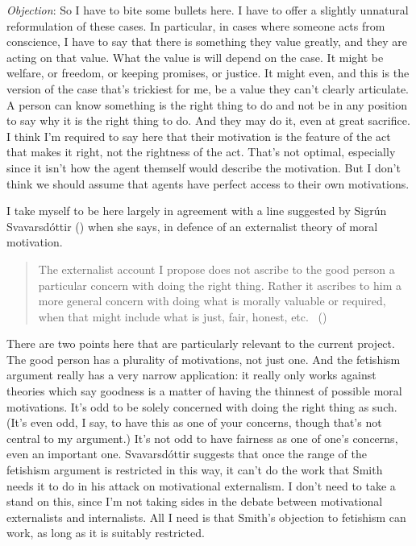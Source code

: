 \documentclass[
  11pt,
  letterpaper,
  DIV=11,
  numbers=noendperiod,
  twoside]{scrartcl}
\begin{document}
\emph{Objection}: So I have to bite some bullets here. I have to offer a
slightly unnatural reformulation of these cases. In particular, in cases
where someone acts from conscience, I have to say that there is
something they value greatly, and they are acting on that value. What
the value is will depend on the case. It might be welfare, or freedom,
or keeping promises, or justice. It might even, and this is the version
of the case that's trickiest for me, be a value they can't clearly
articulate. A person can know something is the right thing to do and not
be in any position to say why it is the right thing to do. And they may
do it, even at great sacrifice. I think I'm required to say here that
their motivation is the feature of the act that makes it right, not the
rightness of the act. That's not optimal, especially since it isn't how
the agent themself would describe the motivation. But I don't think we
should assume that agents have perfect access to their own motivations.

I take myself to be here largely in agreement with a line suggested by
Sigrún Svavarsdóttir () when she
says, in defence of an externalist theory of moral motivation.

\begin{quote}
The externalist account I propose does not ascribe to the good person a
particular concern with doing the right thing. Rather it ascribes to him
a more general concern with doing what is morally valuable or required,
when that might include what is just, fair, honest, etc.
~()
\end{quote}

There are two points here that are particularly relevant to the current
project. The good person has a plurality of motivations, not just one.
And the fetishism argument really has a very narrow application: it
really only works against theories which say goodness is a matter of
having the thinnest of possible moral motivations. It's odd to be solely
concerned with doing the right thing as such. (It's even odd, I say, to
have this as one of your concerns, though that's not central to my
argument.) It's not odd to have fairness as one of one's concerns, even
an important one. Svavarsdóttir suggests that once the range of the
fetishism argument is restricted in this way, it can't do the work that
Smith needs it to do in his attack on motivational externalism. I don't
need to take a stand on this, since I'm not taking sides in the debate
between motivational externalists and internalists. All I need is that
Smith's objection to fetishism can work, as long as it is suitably
restricted.
\end{document}
